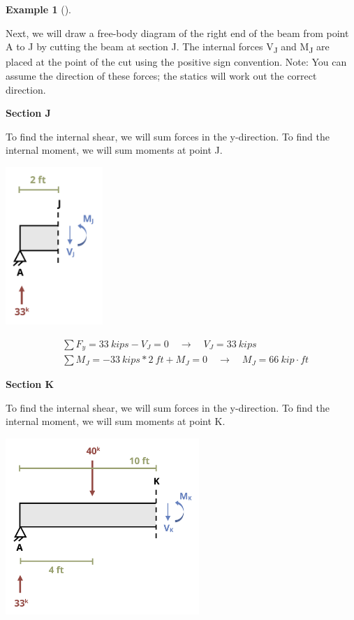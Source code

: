 \documentclass[
  letterpaper,
  DIV=11,
  numbers=noendperiod]{scrreprt}
\theoremstyle{definition}
\newtheorem{example}{Example}[chapter]
\theoremstyle{remark}
\begin{document}
\begin{tcolorbox}
\begin{example}[]
\begin{tcolorbox}
Next, we will draw a free-body diagram of the right end of the beam from
point A to J by cutting the beam at section J. The internal forces
V\textsubscript{J} and M\textsubscript{J} are placed at the point of the
cut using the positive sign convention. Note: You can assume the
direction of these forces; the statics will work out the correct
direction.

\textbf{Section J}

To find the internal shear, we will sum forces in the y-direction. To
find the internal moment, we will sum moments at point J.

\begin{center}
\includegraphics[width=1.44792in,height=\textheight]{images/CH7 PNGs/example 7.1 part 3.png}
\end{center}

\[
\begin{aligned}
&\sum F_y=33{~kips}-V_J=0 \quad\rightarrow\quad V_J=33{~kips} \\
&\sum  M_J=-33{~kips}*2{~ft}+M_J=0 \quad\rightarrow\quad M_J=66{~kip}\cdot{ft}
\end{aligned}
\]

\textbf{Section K}

To find the internal shear, we will sum forces in the y-direction. To
find the internal moment, we will sum moments at point K.

\begin{center}
\includegraphics[width=2.88542in,height=\textheight]{images/CH7 PNGs/example 7.1 part 4.png}
\end{center}


\end{tcolorbox}
\end{example}
\end{tcolorbox}
\end{document}
